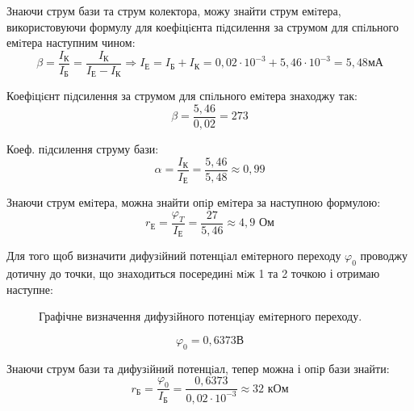 \documentclass[a4paper,14pt]{extreport}
\begin{document}
Знаючи струм бази та струм колектора, можу знайти струм емiтера, використовуючи формулу для коефiцiєнта пiдсилення за струмом для спiльного емiтера наступним чином:
\begin{equation}\label{eq6}
\beta = \dfrac{I_{\text{К}}}{I_{\text{Б}}} =  \dfrac{I_{\text{К}}}{I_{\text{Е}} - I_{\text{К}}} \Rightarrow I_{\text{Е}} = I_{\text{Б}} + I_{\text{К}} = 0,02\cdot 10^{-3} + 5,46 \cdot 10^{-3} = 5,48 \text{мА}
\end{equation}

\newpage
Коефiцiєнт пiдсилення за струмом для спiльного емiтера знаходжу так:
\begin{equation}\label{eq7}
\beta = \dfrac{5,46}{0,02} = 273
\end{equation}

Коеф. пiдсилення струму бази:
\begin{equation}\label{eq8}
\alpha = \dfrac{I_{\text{К}}}{I_{\text{Е}}} =  \dfrac{5,46}{5,48}\approx 0,99
\end{equation}

Знаючи струм емiтера, можна знайти опiр емiтера за наступною формулою:
\begin{equation}\label{eq9}
r_\text{Е} = \dfrac{\varphi_T}{I_\text{Е}}= \dfrac{27}{5,46} \approx 4,9  \text{ Ом}
\end{equation}

Для того щоб визначити дифузiйний потенцiал емiтерного переходу  $\varphi_0$ проводжу дотичну до точки, що знаходиться посерединi мiж  1 та 2 точкою і отримаю наступне:
\begin{figure}[h!]
\caption{Графічне визначення дифузiйного потенцiау емiтерного переходу.}
\label{ris:image9}
\end{figure}

\begin{equation}\label{eq10}
\varphi_0 = 0,6373  \text {В}
\end{equation}

 Знаючи струм бази та дифузiйний потенцiал, тепер можна і опiр бази знайти:
\begin{equation}\label{eq11}
r_\text{Б} = \dfrac{\varphi_0}{I_\text{Б}} =  \dfrac{0,6373}{0,02 \cdot 10^{-3}}  \approx 32  \text{ кОм}
\end{equation}
\end{document}
